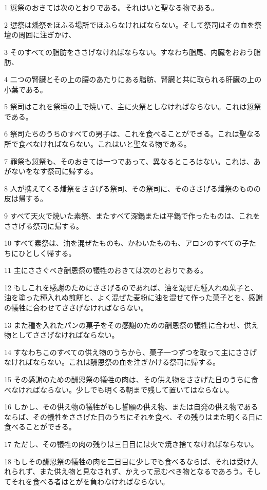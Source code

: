 \par 1 愆祭のおきては次のとおりである。それはいと聖なる物である。
\par 2 愆祭は燔祭をほふる場所でほふらなければならない。そして祭司はその血を祭壇の周囲に注ぎかけ、
\par 3 そのすべての脂肪をささげなければならない。すなわち脂尾、内臓をおおう脂肪、
\par 4 二つの腎臓とその上の腰のあたりにある脂肪、腎臓と共に取られる肝臓の上の小葉である。
\par 5 祭司はこれを祭壇の上で焼いて、主に火祭としなければならない。これは愆祭である。
\par 6 祭司たちのうちのすべての男子は、これを食べることができる。これは聖なる所で食べなければならない。これはいと聖なる物である。
\par 7 罪祭も愆祭も、そのおきては一つであって、異なるところはない。これは、あがないをなす祭司に帰する。
\par 8 人が携えてくる燔祭をささげる祭司、その祭司に、そのささげる燔祭のものの皮は帰する。
\par 9 すべて天火で焼いた素祭、またすべて深鍋または平鍋で作ったものは、これをささげる祭司に帰する。
\par 10 すべて素祭は、油を混ぜたものも、かわいたものも、アロンのすべての子たちにひとしく帰する。
\par 11 主にささぐべき酬恩祭の犠牲のおきては次のとおりである。
\par 12 もしこれを感謝のためにささげるのであれば、油を混ぜた種入れぬ菓子と、油を塗った種入れぬ煎餅と、よく混ぜた麦粉に油を混ぜて作った菓子とを、感謝の犠牲に合わせてささげなければならない。
\par 13 また種を入れたパンの菓子をその感謝のための酬恩祭の犠牲に合わせ、供え物としてささげなければならない。
\par 14 すなわちこのすべての供え物のうちから、菓子一つずつを取って主にささげなければならない。これは酬恩祭の血を注ぎかける祭司に帰する。
\par 15 その感謝のための酬恩祭の犠牲の肉は、その供え物をささげた日のうちに食べなければならない。少しでも明くる朝まで残して置いてはならない。
\par 16 しかし、その供え物の犠牲がもし誓願の供え物、または自発の供え物であるならば、その犠牲をささげた日のうちにそれを食べ、その残りはまた明くる日に食べることができる。
\par 17 ただし、その犠牲の肉の残りは三日目には火で焼き捨てなければならない。
\par 18 もしその酬恩祭の犠牲の肉を三日目に少しでも食べるならば、それは受け入れられず、また供え物と見なされず、かえって忌むべき物となるであろう。そしてそれを食べる者はとがを負わなければならない。
